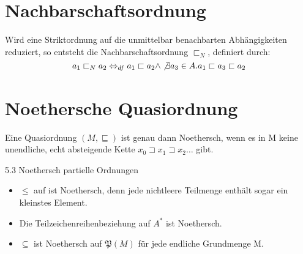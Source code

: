 \documentclass{article}
\begin{document}
\section*{Nachbarschaftsordnung}
\begin{defBox}
	Wird eine Striktordnung auf die unmittelbar benachbarten Abhängigkeiten \\
	reduziert, so entsteht die Nachbarschaftsordnung $\sqsubset_N$, definiert durch:
	\[
		a_1 \sqsubset_N a_2 \Leftrightarrow_{df} a_1 \sqsubset a_2 \land \not \exists a_3 \in A. a_1 \sqsubset a_3 \sqsubset a_2
	\]
\end{defBox}

\section*{Noethersche Quasiordnung}
\begin{defBox}
	Eine Quasiordnung $(M, \sqsubseteq)$ ist genau dann Noethersch,
	wenn es in M keine unendliche, echt absteigende Kette
	$x_0 \sqsupset x_1 \sqsupset x_2 \dots$ gibt.
\end{defBox}
\begin{exampleBox}{5.3 Noethersch partielle Ordnungen}
	\begin{itemize}[label=]
		\item $\leq$ auf  ist Noethersch,
		      denn jede nichtleere Teilmenge enthält
		      sogar ein kleinstes Element.
		\item Die Teilzeichenreihenbeziehung auf $A^{*}$ ist Noethersch.
		\item $\subseteq$ ist Noethersch auf $\mathfrak{P}(M)$ für jede endliche Grundmenge M.
	\end{itemize}
\end{exampleBox}
\end{document}
